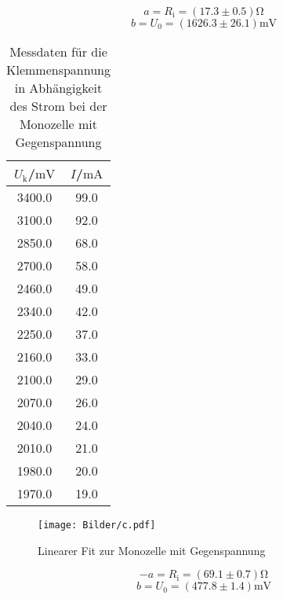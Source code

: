 \begin{equation*}
  a= R_\text{i}=(17.3\pm 0.5)\si{\ohm}
\end{equation*}
\begin{equation*}
  b =U_\text{0}=(1626.3\pm 26.1)\si{\milli\volt}
\end{equation*}
\begin{table}
  \centering
  \label{tab:monozelle_belastet}
  \caption{Messdaten für die Klemmenspannung in Abhängigkeit des Strom bei der Monozelle mit Gegenspannung}
\begin{tabular}{cc}
  \toprule
$U_\text{k}$/$\si{\milli\volt}$ & $I$/$\si{\milli\ampere}$\\
\midrule
3400.0 & 99.0 \\
3100.0 & 92.0 \\
2850.0 & 68.0 \\
2700.0 & 58.0 \\
2460.0 & 49.0 \\
2340.0 & 42.0 \\
2250.0 & 37.0 \\
2160.0 & 33.0 \\
2100.0 & 29.0 \\
2070.0 & 26.0 \\
2040.0 & 24.0 \\
2010.0 & 21.0 \\
1980.0 & 20.0 \\
1970.0 & 19.0 \\
\bottomrule
\end{tabular}
\end{table}
\begin{figure}
\texttt{[image: Bilder/c.pdf]}
\caption{Linearer Fit zur Monozelle mit Gegenspannung}
\label{fig:plot_monozellebelastet}
\end{figure}



\begin{equation*}
  -a= R_\text{i}=(69.1\pm0.7)\si{\ohm}
\end{equation*}
\begin{equation*}
  b =U_\text{0}=(477.8\pm1.4)\si{\milli\volt}
\end{equation*}

